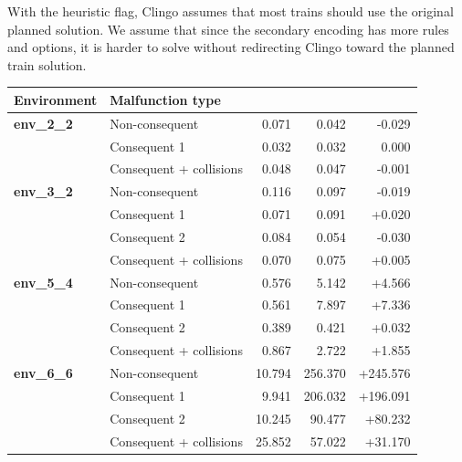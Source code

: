\documentclass[runningheads]{llncs}
\begin{document}
With the heuristic flag, Clingo assumes that most trains should use the
original planned solution. We assume that since the secondary encoding has more rules and options, it is harder to solve without redirecting Clingo toward the planned train solution.

\begin{table}[hbtp]
	\centering
	\footnotesize
	\setlength{\tabcolsep}{4pt}
	\renewcommand{\arraystretch}{0.9}
	\begin{tabular}{@{}llrrr@{}}
		\toprule
		\textbf{Environment} &
		\textbf{Malfunction type} &
		\makecell[r]{\textbf{heuristic}} &
		\makecell[r]{\textbf{~~no heuristic}} &
		\makecell[r]{\textbf{$\Delta T_{\mathrm{res}}$}} \\
		\midrule

		\textbf{env\_2\_2}
		& Non-consequent & 0.071 & 0.042 & -0.029 \\
		& Consequent 1 & 0.032 & 0.032 & 0.000 \\
		& Consequent + collisions & 0.048 & 0.047 & -0.001 \\
		
		\midrule
		
		\textbf{env\_3\_2}
		& Non-consequent & 0.116 & 0.097 & -0.019 \\
		& Consequent 1 & 0.071 & 0.091 & +0.020 \\
		& Consequent 2 & 0.084 & 0.054 & -0.030 \\
		& Consequent + collisions & 0.070 & 0.075 & +0.005 \\
		
		\midrule
		
		\textbf{env\_5\_4}
		& Non-consequent & 0.576 & 5.142 & +4.566 \\
		& Consequent 1 & 0.561 & 7.897 & +7.336 \\
		& Consequent 2 & 0.389 & 0.421 & +0.032 \\
		& Consequent + collisions & 0.867 & 2.722 & +1.855 \\
		
		\midrule
		
		\textbf{env\_6\_6}
		& Non-consequent & 10.794 & 256.370 & +245.576 \\
		& Consequent 1 & 9.941 & 206.032 & +196.091 \\
		& Consequent 2 & 10.245 & 90.477 & +80.232 \\
		& Consequent + collisions & 25.852 & 57.022 & +31.170 \\

		\midrule
		

\end{tabular}
\end{table}
\end{document}

